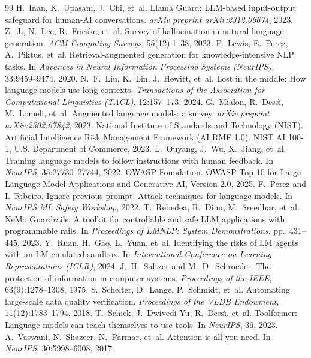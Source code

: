 \documentclass[10pt,a4paper,twocolumn]{article}
\begin{document}
\begin{thebibliography}{99}
 H.~Inan, K.~Upasani, J.~Chi, et~al. Llama Guard: LLM-based input-output safeguard for human-AI conversations. \emph{arXiv preprint arXiv:2312.06674}, 2023.
 Z.~Ji, N.~Lee, R.~Frieske, et~al. Survey of hallucination in natural language generation. \emph{ACM Computing Surveys}, 55(12):1--38, 2023.
 P.~Lewis, E.~Perez, A.~Piktus, et~al. Retrieval-augmented generation for knowledge-intensive NLP tasks. In \emph{Advances in Neural Information Processing Systems (NeurIPS)}, 33:9459--9474, 2020.
 N.~F.~Liu, K.~Lin, J.~Hewitt, et~al. Lost in the middle: How language models use long contexts. \emph{Transactions of the Association for Computational Linguistics (TACL)}, 12:157--173, 2024.
 G.~Mialon, R.~Dess{\`\i}, M.~Lomeli, et~al. Augmented language models: a survey. \emph{arXiv preprint arXiv:2302.07842}, 2023.
 National Institute of Standards and Technology (NIST). Artificial Intelligence Risk Management Framework (AI RMF 1.0). NIST AI 100-1, U.S. Department of Commerce, 2023.
 L.~Ouyang, J.~Wu, X.~Jiang, et~al. Training language models to follow instructions with human feedback. In \emph{NeurIPS}, 35:27730--27744, 2022.
 OWASP Foundation. OWASP Top 10 for Large Language Model Applications and Generative AI, Version 2.0, 2025.
 F.~Perez and I.~Ribeiro. Ignore previous prompt: Attack techniques for language models. In \emph{NeurIPS ML Safety Workshop}, 2022.
 T.~Rebedea, R.~Dinu, M.~Sreedhar, et~al. NeMo Guardrails: A toolkit for controllable and safe LLM applications with programmable rails. In \emph{Proceedings of EMNLP: System Demonstrations}, pp.~431--445, 2023.
 Y.~Ruan, H.~Gao, L.~Yuan, et~al. Identifying the risks of LM agents with an LM-emulated sandbox. In \emph{International Conference on Learning Representations (ICLR)}, 2024.
 J.~H.~Saltzer and M.~D.~Schroeder. The protection of information in computer systems. \emph{Proceedings of the IEEE}, 63(9):1278--1308, 1975.
 S.~Schelter, D.~Lange, P.~Schmidt, et~al. Automating large-scale data quality verification. \emph{Proceedings of the VLDB Endowment}, 11(12):1783--1794, 2018.
 T.~Schick, J.~Dwivedi-Yu, R.~Dess{\`\i}, et~al. Toolformer: Language models can teach themselves to use tools. In \emph{NeurIPS}, 36, 2023.
 A.~Vaswani, N.~Shazeer, N.~Parmar, et~al. Attention is all you need. In \emph{NeurIPS}, 30:5998--6008, 2017.

\end{thebibliography}
\end{document}

